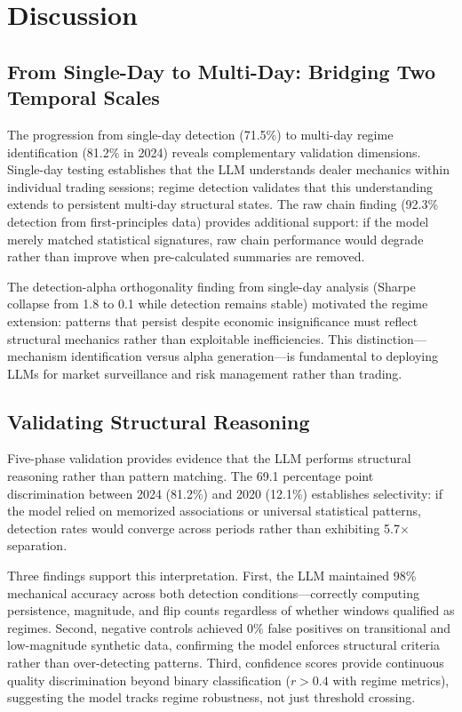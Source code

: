 \section{Discussion}
\label{sec:discussion}

\subsection{From Single-Day to Multi-Day: Bridging Two Temporal Scales}

The progression from single-day detection (71.5\%) to multi-day regime identification (81.2\% in 2024) reveals complementary validation dimensions. Single-day testing establishes that the LLM understands dealer mechanics within individual trading sessions; regime detection validates that this understanding extends to persistent multi-day structural states. The raw chain finding (92.3\% detection from first-principles data) provides additional support: if the model merely matched statistical signatures, raw chain performance would degrade rather than improve when pre-calculated summaries are removed.

The detection-alpha orthogonality finding from single-day analysis (Sharpe collapse from 1.8 to 0.1 while detection remains stable) motivated the regime extension: patterns that persist despite economic insignificance must reflect structural mechanics rather than exploitable inefficiencies. This distinction---mechanism identification versus alpha generation---is fundamental to deploying LLMs for market surveillance and risk management rather than trading.

\subsection{Validating Structural Reasoning}

Five-phase validation provides evidence that the LLM performs structural reasoning rather than pattern matching. The 69.1 percentage point discrimination between 2024 (81.2\%) and 2020 (12.1\%) establishes selectivity: if the model relied on memorized associations or universal statistical patterns, detection rates would converge across periods rather than exhibiting 5.7$\times$ separation.

Three findings support this interpretation. First, the LLM maintained 98\% mechanical accuracy across both detection conditions---correctly computing persistence, magnitude, and flip counts regardless of whether windows qualified as regimes. Second, negative controls achieved 0\% false positives on transitional and low-magnitude synthetic data, confirming the model enforces structural criteria rather than over-detecting patterns. Third, confidence scores provide continuous quality discrimination beyond binary classification ($r > 0.4$ with regime metrics), suggesting the model tracks regime robustness, not just threshold crossing.

